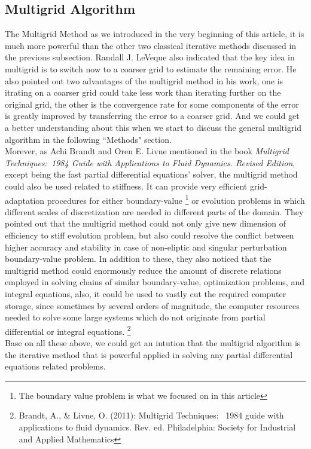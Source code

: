 \documentclass [a4paper, 12pt]{article}
\begin{document}
\subsection {Multigrid Algorithm}
The Multigrid Method as we introduced in the very beginning of this article, it is much more powerful than the other two classical iterative methods discussed in the previous subsection. Randall J. LeVeque also indicated that the key idea in multigrid is to switch now to a coarser grid to estimate the remaining error. He also pointed out two advantages of the multigrid method in his work, one is itrating on a coarser grid could take less work than iterating further on the original grid, the other is the convergence rate for some components of the error is greatly improved by transferring the error to a coarser grid. And we could get a better understanding about this when we start to discuss the general multigrid algorithm in the following ``Methods" section. \\
Morever, as Achi Brandt and Oren E. Livne mentioned in the book \emph {Multigrid Techniques:\
1984 Guide with Applications to Fluid Dynamics. Revised Edition}, except being the fast partial differential equations' solver, the multigrid method could also be used related to stiffness. It can provide very efficient grid-adaptation procedures for either boundary-value \footnote {The boundary value problem is what we focused on in this article} or evolution problems in which different scales of discretization are needed in different parts of the domain. They pointed out that the multigrid method could not only give new dimension of efficiency to stiff evolution problem, but also could resolve the conflict between higher accuracy and stability in case of non-eliptic and singular perturbation boundary-value problem. In addition to these, they also noticed that the multigrid method could enormously reduce the amount of discrete relations employed in solving chains of similar boundary-value, optimization problems, and integral equations, also, it could be used to vastly cut the required computer storage, since sometimes by several orders of magnitude, the computer resources needed to solve some large systems which do not originate from partial differential or integral equations. \footnote {Brandt, A., \& Livne, O. (2011): Multigrid Techniques: \
1984 guide with applications to fluid dynamics. Rev. ed. Philadelphia: Society for Industrial and 
Applied Mathematics} \\
Base on all these above, we could get an intution that the multigrid algorithm is the iterative method that is powerful applied in solving any partial differential equations related problems.
\end{document}
